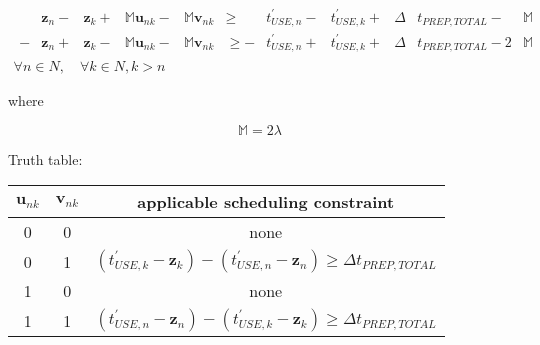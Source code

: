 \begin{equation}
    \begin{split}
        \begin{alignedat}{10}
        &\boldsymbol{z}_{n} {}-{} &\boldsymbol{z}_{k} {}+{} &\mathbb{M}
        \boldsymbol{u}_{nk} {}-{} &\mathbb{M} \boldsymbol{v}_{nk} &\ge
        &t_{USE,n}^{\prime} {}-{} &t_{USE,k}^{\prime} {}+{}
        &\Delta &t_{PREP,TOTAL} {}-{} &\mathbb{M}\\
        - &\boldsymbol{z}_{n} {}+{} &\boldsymbol{z}_{k} {}-{} &\mathbb{M}
        \boldsymbol{u}_{nk} {}-{} &\mathbb{M} \boldsymbol{v}_{nk} &\ge
        - &t_{USE,n}^{\prime} {}+{} &t_{USE,k}^{\prime} {}+{}
        &\Delta &t_{PREP,TOTAL} {}-{} 2 &\mathbb{M}
        \end{alignedat}
        \\\forall n \in N, \quad \forall k \in N, k > n
    \end{split}
\end{equation}

where

\begin{equation}
    \mathbb{M} = 2 \lambda
\end{equation}

Truth table:

\begin{center}
    \begin{tabular}{c c | c}
        $\boldsymbol{u}_{nk}$ & $\boldsymbol{v}_{nk}$ 
        & applicable scheduling constraint\\ \hline
        0 & 0 & none\\
        0 & 1 & $\left( t_{USE,k}^{\prime} - \boldsymbol{z}_{k} \right)
            - \left( t_{USE,n}^{\prime} - \boldsymbol{z}_{n} \right)
            \ge \Delta t_{PREP,TOTAL}$\\
        1 & 0 & none\\
        1 & 1 & $\left( t_{USE,n}^{\prime} - \boldsymbol{z}_{n} \right)
            - \left( t_{USE,k}^{\prime} - \boldsymbol{z}_{k} \right)
            \ge \Delta t_{PREP,TOTAL}$\\
    \end{tabular}
\end{center}
